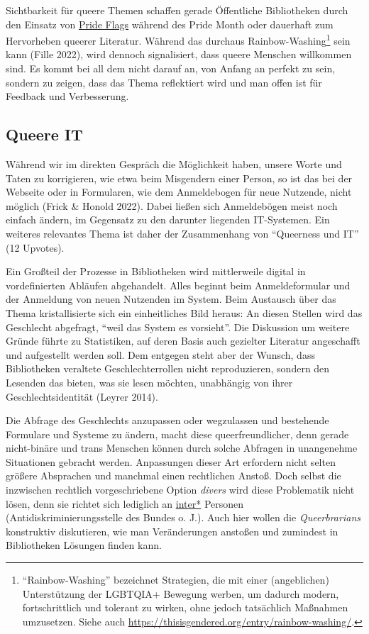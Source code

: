 \documentclass[a4paper,
fontsize=11pt,
oneside,
numbers=noperiodatend,
parskip=half-,
bibliography=totoc,
final
]{scrartcl}
\begin{document}
Sichtbarkeit für queere Themen schaffen gerade Öffentliche Bibliotheken
durch den Einsatz von
\href{https://queer-lexikon.net/pride-flags/}{Pride Flags} während des
Pride Month oder dauerhaft zum Hervorheben queerer Literatur. Während
das durchaus Rainbow-Washing\footnote{\enquote{Rainbow-Washing}
  bezeichnet Strategien, die mit einer (angeblichen) Unterstützung der
  LGBTQIA+ Bewegung werben, um dadurch modern, fortschrittlich und
  tolerant zu wirken, ohne jedoch tatsächlich Maßnahmen umzusetzen.
  Siehe auch \url{https://thisisgendered.org/entry/rainbow-washing/}.}
sein kann (Fille 2022), wird dennoch signalisiert, dass queere Menschen
willkommen sind. Es kommt bei all dem nicht darauf an, von Anfang an
perfekt zu sein, sondern zu zeigen, dass das Thema reflektiert wird und
man offen ist für Feedback und Verbesserung.

\subsection{Queere IT}\label{queere-it}

Während wir im direkten Gespräch die Möglichkeit haben, unsere Worte und
Taten zu korrigieren, wie etwa beim Misgendern einer Person, so ist das
bei der Webseite oder in Formularen, wie dem Anmeldebogen für neue
Nutzende, nicht möglich (Frick \& Honold 2022). Dabei ließen sich
Anmeldebögen meist noch einfach ändern, im Gegensatz zu den darunter
liegenden IT-Systemen. Ein weiteres relevantes Thema ist daher der
Zusammenhang von \enquote{Queerness und IT} (12 Upvotes).

Ein Großteil der Prozesse in Bibliotheken wird mittlerweile digital in
vordefinierten Abläufen abgehandelt. Alles beginnt beim Anmeldeformular
und der Anmeldung von neuen Nutzenden im System. Beim Austausch über das
Thema kristallisierte sich ein einheitliches Bild heraus: An diesen
Stellen wird das Geschlecht abgefragt, \enquote{weil das System es
vorsieht}. Die Diskussion um weitere Gründe führte zu Statistiken, auf
deren Basis auch gezielter Literatur angeschafft und aufgestellt werden
soll. Dem entgegen steht aber der Wunsch, dass Bibliotheken veraltete
Geschlechterrollen nicht reproduzieren, sondern den Lesenden das bieten,
was sie lesen möchten, unabhängig von ihrer Geschlechtsidentität (Leyrer
2014).

Die Abfrage des Geschlechts anzupassen oder wegzulassen und bestehende
Formulare und Systeme zu ändern, macht diese queerfreundlicher, denn
gerade nicht-binäre und trans Menschen können durch solche Abfragen in
unangenehme Situationen gebracht werden. Anpassungen dieser Art
erfordern nicht selten größere Absprachen und manchmal einen rechtlichen
Anstoß. Doch selbst die inzwischen rechtlich vorgeschriebene Option
\emph{divers} wird diese Problematik nicht lösen, denn sie richtet sich
lediglich an \href{https://lgbtqia.mywikis.wiki/wiki/Intersex}{inter*}
Personen (Antidiskriminierungsstelle des Bundes o. J.). Auch hier wollen
die \emph{Queerbrarians} konstruktiv diskutieren, wie man Veränderungen
anstoßen und zumindest in Bibliotheken Lösungen finden kann.
\end{document}
